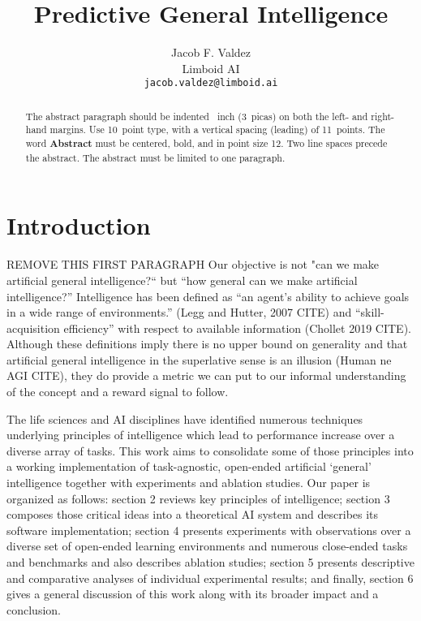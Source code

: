 \documentclass{article}
\title{Predictive General Intelligence}
\author{%
  Jacob F. Valdez \\
  Limboid AI \\
  \texttt{jacob.valdez@limboid.ai}
}
\begin{document}
\maketitle

\begin{abstract}
  The abstract paragraph should be indented ~inch (3~picas) on
  both the left- and right-hand margins. Use 10~point type, with a vertical
  spacing (leading) of 11~points.  The word \textbf{Abstract} must be centered,
  bold, and in point size 12. Two line spaces precede the abstract. The abstract
  must be limited to one paragraph.
\end{abstract}

\section{Introduction}


REMOVE THIS FIRST PARAGRAPH
Our objective is not "can we make artificial general intelligence?`` but “how general can we make artificial intelligence?” Intelligence has been defined as “an agent’s ability to achieve goals in a wide range of environments.” (Legg and Hutter, 2007 CITE) and “skill-acquisition efficiency” with respect to available information (Chollet 2019 CITE). Although these definitions imply there is no upper bound on generality and that artificial general intelligence in the superlative sense is an illusion (Human ne AGI CITE), they do provide a metric we can put to our informal understanding of the concept and a reward signal to follow.

The life sciences and AI disciplines have identified numerous techniques underlying principles of intelligence which lead to performance increase over a diverse array of tasks. This work aims to consolidate some of those principles into a working implementation of task-agnostic, open-ended artificial ‘general’ intelligence together with experiments and ablation studies. Our paper is organized as follows: section 2 reviews key principles of intelligence; section 3 composes those critical ideas into a theoretical AI system and describes its software implementation; section 4 presents experiments with observations over a diverse set of open-ended learning environments and numerous close-ended tasks and benchmarks and also describes ablation studies; section 5 presents descriptive and comparative analyses of individual experimental results; and finally, section 6 gives a general discussion of this work along with its broader impact and a conclusion. 
\end{document}
